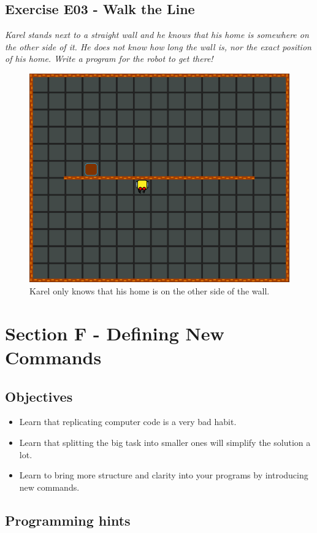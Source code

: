 \documentclass[article,A4,12pt]{llncs}
\begin{document}
{{{{\subsection{Exercise E03 - Walk the Line}

{\em Karel stands next to a straight wall and he knows that his home is somewhere on the other side of it. He does not know how long the wall is, nor the exact position of his home. Write a program for the robot to get there!}

\begin{figure}[!ht]
\begin{center}
\includegraphics[height=0.4\textwidth]{img/e03.png}
\end{center}
\vspace{-4mm}
\caption{Karel only knows that his home is on the other side of the wall.}
\label{fig:e03}
\end{figure}
\noindent


\section{Section F - Defining New Commands} \label{sec:newcom}

\subsection{Objectives} 
 
\begin{itemize}
\item Learn that replicating computer code is a very bad habit.
\item Learn that splitting the big task into smaller ones will simplify the solution a lot. 
\item Learn to bring more structure and clarity into your programs by introducing new commands.
\end{itemize}

\subsection{Programming hints}

}}}}
\end{document}
